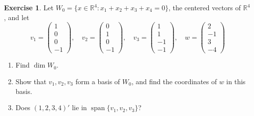 \documentclass[12pt]{article}
\newcommand{\R}{\mathbb R}
\DeclareMathOperator{\Span}{span}
\theoremstyle{definition}
\newtheorem{exercise}{Exercise}
\begin{document}
\begin{exercise}\label{r4-dr-basis-check}
Let \(W_0=\{x\in\R^4:x_1+x_2+x_3+x_4=0\}\), the centered vectors of \(\R^4\), and let
\[
v_1=\begin{pmatrix}1\\0\\0\\-1\end{pmatrix},\quad v_2=\begin{pmatrix}0\\1\\0\\-1\end{pmatrix},\quad
v_3=\begin{pmatrix}1\\1\\-1\\-1\end{pmatrix},\quad w=\begin{pmatrix}2\\-1\\3\\-4\end{pmatrix}
\]
\begin{enumerate}
\item Find \(\dim W_0\).
\item Show that \(v_1,v_2,v_3\) form a basis of \(W_0\), and find the coordinates of \(w\) in this basis.
\item Does \((1,2,3,4)'\) lie in \(\Span\{v_1,v_2,v_3\}\)?
\end{enumerate}
\end{exercise}
\end{document}
